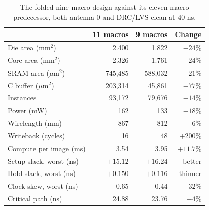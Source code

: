 \documentclass[conference,a4paper]{APSIPA2026}
\begin{document}
\begin{table}[!ht]
\caption{The folded nine-macro design against its eleven-macro predecessor, both antenna-0 and DRC/LVS-clean at 40 ns.}
\label{tab:vs11}
\centering
\renewcommand{\arraystretch}{1.08}
\begin{tabular}{@{}lrrr@{}}
\toprule
 & 11 macros & 9 macros & Change \\
\midrule
Die area (mm$^2$)      & 2.400   & 1.822   & $-24\%$ \\
Core area (mm$^2$)     & 2.326   & 1.761   & $-24\%$ \\
SRAM area ($\mu$m$^2$) & 745,485 & 588,032 & $-21\%$ \\
C buffer ($\mu$m$^2$)  & 203,314 & 45,861  & $-77\%$ \\
Instances              & 93,172  & 79,676  & $-14\%$ \\
Power (mW)             & 162     & 133     & $-18\%$ \\
Wirelength (mm)        & 867     & 812     & $-6\%$ \\
Writeback (cycles)     & 16      & 48      & $+200\%$ \\
Compute per image (ms) & 3.54    & 3.95    & $+11.7\%$ \\
Setup slack, worst (ns) & $+15.12$ & $+16.24$ & better \\
Hold slack, worst (ns)  & $+0.150$ & $+0.116$ & thinner \\
Clock skew, worst (ns)  & 0.65    & 0.44    & $-32\%$ \\
Critical path (ns)      & 24.88   & 23.76   & $-4\%$ \\
\bottomrule
\end{tabular}
\end{table}
\end{document}
